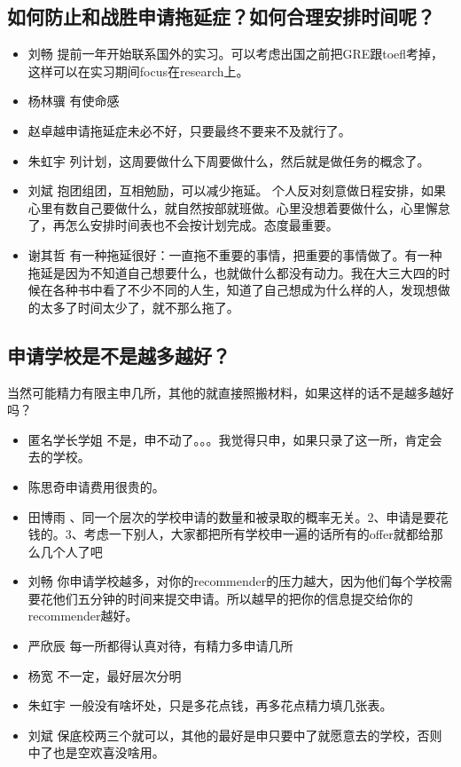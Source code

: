 \documentclass{vivid_layout}
\begin{document}
\subsection{如何防止和战胜申请拖延症？如何合理安排时间呢？}
\begin{itemize}
\item  { 刘畅}  \quad 提前一年开始联系国外的实习。可以考虑出国之前把GRE跟toefl考掉，这样可以在实习期间focus在research上。
\item  { 杨林骥}  \quad 有使命感
\item  { 赵卓越}申请拖延症未必不好，只要最终不要来不及就行了。
\item  { 朱虹宇}  \quad 列计划，这周要做什么下周要做什么，然后就是做任务的概念了。
\item  { 刘斌}  \quad 抱团组团，互相勉励，可以减少拖延。
    个人反对刻意做日程安排，如果心里有数自己要做什么，就自然按部就班做。心里没想着要做什么，心里懈怠了，再怎么安排时间表也不会按计划完成。态度最重要。
\item  { 谢其哲}  \quad 有一种拖延很好：一直拖不重要的事情，把重要的事情做了。有一种拖延是因为不知道自己想要什么，也就做什么都没有动力。我在大三大四的时候在各种书中看了不少不同的人生，知道了自己想成为什么样的人，发现想做的太多了时间太少了，就不那么拖了。
\end{itemize}

\subsection{ 申请学校是不是越多越好？}
当然可能精力有限主申几所，其他的就直接照搬材料，如果这样的话不是越多越好吗？
\begin{itemize}
\item   {\name 匿名学长学姐}  \quad 不是，申不动了。。。我觉得只申，如果只录了这一所，肯定会去的学校。
\item { 陈思奇}\quad 申请费用很贵的。
\item  { 田博雨}  、同一个层次的学校申请的数量和被录取的概率无关。2、申请是要花钱的。3、考虑一下别人，大家都把所有学校申一遍的话所有的offer就都给那么几个人了吧
\item  { 刘畅}  \quad 你申请学校越多，对你的recommender的压力越大，因为他们每个学校需要花他们五分钟的时间来提交申请。所以越早的把你的信息提交给你的recommender越好。
\item  { 严欣辰}  \quad 每一所都得认真对待，有精力多申请几所
\item  { 杨宽}  \quad 不一定，最好层次分明
\item  { 朱虹宇}  \quad 一般没有啥坏处，只是多花点钱，再多花点精力填几张表。
\item  { 刘斌}  \quad 保底校两三个就可以，其他的最好是申只要中了就愿意去的学校，否则中了也是空欢喜没啥用。
\end{itemize}
\end{document}
